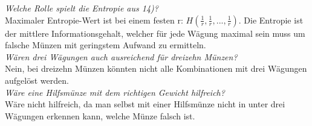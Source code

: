   \textit{Welche Rolle spielt die Entropie aus 14)?}\\
  \newline
  Maximaler Entropie-Wert ist bei einem festen r: $H(\frac{1}{r}, \frac{1}{r}, ..., \frac{1}{r})$. Die Entropie ist der mittlere Informationsgehalt, welcher für jede Wägung maximal sein muss um falsche Münzen mit geringstem Aufwand zu ermitteln.\\

  \textit{Wären drei Wägungen auch ausreichend für dreizehn Münzen?}\\
  \newline
  Nein, bei dreizehn Münzen könnten nicht alle Kombinationen mit drei Wägungen aufgelöst werden.\\

  \textit{Wäre eine Hilfsmünze mit dem richtigen Gewicht hilfreich?}\\
  \newline
  Wäre nicht hilfreich, da man selbst mit einer Hilfsmünze nicht in unter drei Wägungen erkennen kann, welche Münze falsch ist.\\


